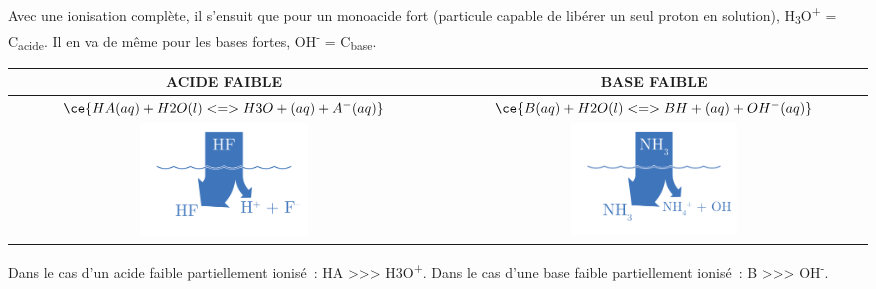 \documentclass[
  11pt,
  french,
  a4paper,
  openany]{book}
\begin{document}
Avec une ionisation complète, il s'ensuit que pour un monoacide fort (particule capable de libérer un seul proton en solution), \textbar H\textsubscript{3}O\textsuperscript{+}\textbar{} = C\textsubscript{acide}. Il en va de même pour les bases fortes, \textbar OH\textsuperscript{-}\textbar{} = C\textsubscript{base}.

\begin{longtable}[]{@{}cc@{}}
\toprule
\begin{minipage}[b]{0.48\columnwidth}\centering
ACIDE FAIBLE\strut
\end{minipage} & \begin{minipage}[b]{0.47\columnwidth}\centering
BASE FAIBLE\strut
\end{minipage}\tabularnewline
\midrule
\endhead
\begin{minipage}[t]{0.48\columnwidth}\centering
\(\ce{HA(aq) + H2O(l) <=> H3O+(aq) + A^{-}(aq)}\)\strut
\end{minipage} & \begin{minipage}[t]{0.47\columnwidth}\centering
\(\ce{B(aq) + H2O(l) <=> BH+(aq) + OH^{-}(aq)}\)\strut
\end{minipage}\tabularnewline
\begin{minipage}[t]{0.48\columnwidth}\centering
\includegraphics[width=0.4\textwidth,height=\textheight]{images/acides-faibles-1.png}\strut
\end{minipage} & \begin{minipage}[t]{0.47\columnwidth}\centering
\includegraphics[width=0.4\textwidth,height=\textheight]{images/bases-faibles-1.png}\strut
\end{minipage}\tabularnewline
\bottomrule
\end{longtable}

Dans le cas d'un acide faible partiellement ionisé~: \textbar HA\textbar{} \textgreater\textgreater\textgreater{} \textbar H3O\textsuperscript{+}\textbar. Dans le cas d'une base faible partiellement ionisé~: \textbar B\textbar{} \textgreater\textgreater\textgreater{} \textbar OH\textsuperscript{-}\textbar.
\end{document}

